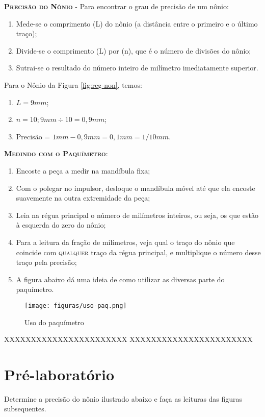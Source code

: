 \textsc{\textbf{Precisão do Nônio}} - Para encontrar o grau de precisão de um nônio:
\begin{enumerate}
\item Mede-se o comprimento (L) do nônio (a distância entre o primeiro e o último traço);
\item Divide-se o comprimento (L) por (n), que é o número de divisões do nônio;
\item Sutrai-se o resultado do número inteiro de milímetro imediatamente superior.
\end{enumerate}


Para o Nônio da Figura \ref{fig:reg-non}, temos:
\begin{enumerate}
\item $L = 9mm$;
\item $n=10; 9mm\div 10= 0,9mm$;
\item Precisão = $1mm - 0,9mm = 0,1mm = 1/10mm$.
\end{enumerate}

\textsc{\textbf{Medindo com o Paquímetro}}:
\begin{enumerate}
\item Encoste a peça a medir na mandíbula fixa;
\item Com o polegar no impulsor, desloque o mandíbula móvel até que ela encoste suavemente na outra extremidade da peça;
\item Leia na régua principal o número de milímetros inteiros, ou seja, os que estão à esquerda do zero do nônio;
\item Para a leitura da fração de milímetros, veja qual o traço do nônio que coincide com \textsc{qualquer} traço da régua principal, e multiplique o número desse traço pela precisão;
\item A figura abaixo dá uma ideia de como utilizar as diversas parte do paquímetro.

\end{enumerate}

\begin{figure}[ht]
\centering
\label{fig:uso-paq}
\texttt{[image: figuras/uso-paq.png]} 
\caption{Uso do paquímetro}
\end{figure}

XXXXXXXXXXXXXXXXXXXXXXX
XXXXXXXXXXXXXXXXXXXXXXX

\section{Pré-laboratório}
Determine a precisão do nônio ilustrado abaixo e faça as leituras das figuras subsequentes.

